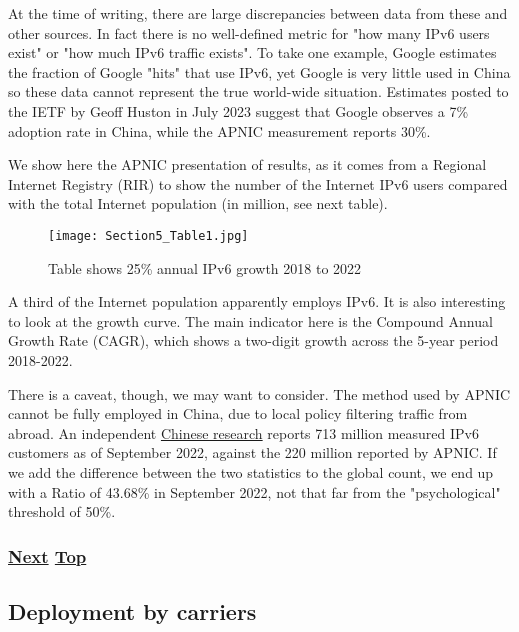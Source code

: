 \documentclass[
]{article}
\begin{document}
At the time of writing, there are large discrepancies between data from
these and other sources. In fact there is no well-defined metric for
"how many IPv6 users exist" or "how much IPv6 traffic exists". To take
one example, Google estimates the fraction of Google "hits" that use
IPv6, yet Google is very little used in China so these data cannot
represent the true world-wide situation. Estimates posted to the IETF by
Geoff Huston in July 2023 suggest that Google observes a 7\% adoption
rate in China, while the APNIC measurement reports 30\%.

We show here the APNIC presentation of results, as it comes from a
Regional Internet Registry (RIR) to show the number of the Internet IPv6
users compared with the total Internet population (in million, see next
table).

\begin{figure}
\centering
\texttt{[image: Section5\_Table1.jpg]}
\caption{Table shows 25\% annual IPv6 growth 2018 to 2022}
\end{figure}

A third of the Internet population apparently employs IPv6. It is also
interesting to look at the growth curve. The main indicator here is the
Compound Annual Growth Rate (CAGR), which shows a two-digit growth
across the 5-year period 2018-2022.

There is a caveat, though, we may want to consider. The method used by
APNIC cannot be fully employed in China, due to local policy filtering
traffic from abroad. An independent
\href{https://www.china-ipv6.cn/\#/activeconnect/simpleInfo}{Chinese
research} reports 713 million measured IPv6 customers as of September
2022, against the 220 million reported by APNIC. If we add the
difference between the two statistics to the global count, we end up
with a Ratio of 43.68\% in September 2022, not that far from the
"psychological" threshold of 50\%.

\subsubsection{\texorpdfstring{\hyperref[deployment-by-carriers]{Next}
\hyperref[deployment-status]{Top}}{Next Top}}\label{next-top-7}

\pagebreak

\subsection{Deployment by carriers}\label{deployment-by-carriers}
\end{document}
